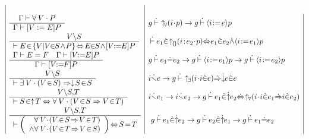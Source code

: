\documentclass{llncs}
\begin{document}
\begin{table}
\[\begin{array}{|l|l|}
\\

\begin{array}{c}
\Gamma \vdash \forall\: V \cdot P\\\hline \Gamma \vdash [V:=E]P
\end{array}
&
g \Binf \Bbdfor{i}{p} \to g \Binf \Baffec{i}{e}{p}

\\

\begin{array}{c}
V \backslash S
\\\hline \vdash E\!\in\!\{V|V\!\!\in\!\!S\!\land\!P\}\!\Leftrightarrow\!E\!\!\in\!\!S\!\land\!
 [V\!\!:=\!\!E]P
\end{array}
&
\Binf e_1\pins\Bbdcmp{i}{e_2}{p}\piff e_1\pins e_2\pand \Baffec{i}{e_1}{p}

\\

\begin{array}{c}
\Gamma \vdash E=F \quad \Gamma \vdash [V\!\!:=\!\!E]P\\\hline \Gamma \vdash [V\!\!:=\!\!F]P
\end{array}
&
g\Binf e_1\pequ e_2\to g\Binf\Baffec{i}{e_1}{p}\to g\Binf\Baffec{i}{e_2}{p}

\\

\begin{array}{c}
V \backslash S
\\\hline
\vdash \exists\:  V \cdot (V\!\in\!S) \Rightarrow \downarrow\! S\!\in\!S
\end{array}
&
i \Bnotfree e \to g\Binf\Bbdexs{i}{i\pins e}\pimp\echs e\pins e

\\

\begin{array}{c}
V \backslash S,\!T \\\hline
\vdash S\!\in \uparrow\! T \Leftrightarrow \forall\: V \cdot (V\!\in\!S \Rightarrow V\!\in\!T)
\end{array}
&
i \Bnotfree e_1 \to i \Bnotfree e_2 \to
g \Binf e_1 \pins \epow e_2 \piff \Bbdfor{i}{i\pins e_1\pimp i\pins e_2}

\\

\begin{array}{c}
V \backslash S,\!T \\\hline
\vdash
\left(
\begin{array}{l}
\:\:\: \forall\:V\!\cdot\!(V\!\in\!S\!\Rightarrow\!V\!\in\!T) \\
\land \forall\:V\!\cdot\!(V\!\in\!T\!\Rightarrow\!V\!\in\!S)
\end{array}
\right)
\!\Leftrightarrow\!S\!=\!T
\end{array}
&
\begin{array}{l}
\!g\Binf e_1\pins\epow e_2\to g\Binf e_2\pins\epow e_1\to g\Binf e_1\pequ e_2
\end{array}


\end{array}\]
\end{table}
\end{document}
